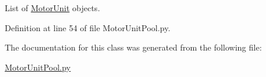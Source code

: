 List of \hyperlink{namespace_motor_unit}{Motor\+Unit} objects. 



Definition at line 54 of file Motor\+Unit\+Pool.\+py.



The documentation for this class was generated from the following file\+:\begin{DoxyCompactItemize}
\item 
\hyperlink{_motor_unit_pool_8py}{Motor\+Unit\+Pool.\+py}\end{DoxyCompactItemize}
